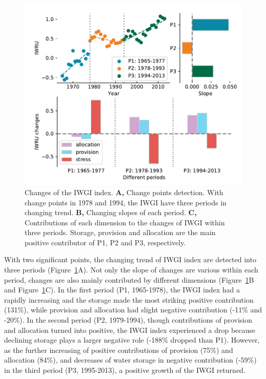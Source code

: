 \documentclass[9pt, twocolumn, twoside, lineno]{pnas-new}
\begin{document}
\begin{figure}[ht!]
	\centering
	\includegraphics[width=\linewidth]{../../figures/main/index.pdf}
	\caption{Changes of the IWGI index. 
	\textbf{A,} Change points detection. With change points in 1978 and 1994, the IWGI have three periods in changing trend.
	\textbf{B,} Changing slopes of each period.
	\textbf{C,} Contributions of each dimension to the changes of IWGI within three periods. Storage, provision and allocation are the main positive contributor of P1, P2 and P3, respectively.
	}
	\label{fig:IWGI}
\end{figure}

With two significant points, the changing trend of IWGI index are detected into three periods (Figure~\ref{fig:IWGI}A). 
Not only the slope of changes are various within each period, changes are also mainly contributed by different dimensions (Figure~\ref{fig:IWGI}B and Figure~\ref{fig:IWGI}C).
In the first period (P1, 1965-1978), the IWGI index had a rapidly increasing and the storage made the most striking positive contribution (131\%), while provision and allocation had slight negative contribution (-11\% and -20\%).
In the second period (P2, 1979-1994), though contributions of provision and allocation turned into positive, the IWGI index experienced a drop because declining storage plays a larger negative role (-188\% dropped than P1). 
However, as the further increasing of positive contributions of provision (75\%) and allocation (84\%), and decreases of water storage in negative contribution (-59\%) in the third period (P3, 1995-2013), a positive growth of the IWGI returned.
\end{document}

